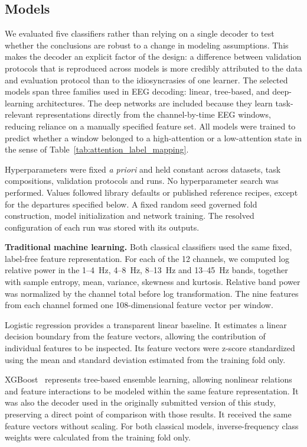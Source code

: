 \documentclass[10pt,letterpaper]{article}
\newcommand{\rev}[1]{#1}
\newcommand{\revs}[1]{#1}
\begin{document}
\subsection*{\revs{Models}}

\rev{We evaluated five classifiers rather than relying on a single decoder to
test whether the conclusions are robust to a change in modeling assumptions.
This makes the decoder an explicit factor of the design: a difference between
validation protocols that is reproduced across models is more credibly
attributed to the data and evaluation protocol than to the idiosyncrasies of
one learner. The selected models span three families used in EEG decoding:
linear, tree-based, and deep-learning architectures. The deep networks are
included because they learn task-relevant representations directly from the
channel-by-time EEG windows, reducing reliance on a manually specified feature
set. All models were trained to predict whether a window belonged to a
high-attention or a low-attention state in the sense of
Table~\ref{tab:attention_label_mapping}.}

\rev{Hyperparameters were fixed \textit{a priori} and held constant across
datasets, task compositions, validation protocols and runs. No hyperparameter
search was performed. Values followed library defaults or published reference
recipes, except for the departures specified below. A fixed random seed
governed fold construction, model initialization and network training. The
resolved configuration of each run was stored with its outputs.}

\textbf{Traditional machine learning.}
\rev{Both classical classifiers used the same fixed, label-free feature
representation. For each of the 12 channels, we computed log relative power in
the 1--4~Hz, 4--8~Hz, 8--13~Hz and 13--45~Hz bands, together with sample
entropy, mean, variance, skewness and kurtosis. Relative band power was
normalized by the channel total before log transformation. The nine features
from each channel formed one 108-dimensional feature vector per window.}

\rev{Logistic regression provides a transparent linear baseline. It estimates
a linear decision boundary from the feature vectors, allowing the contribution
of individual features to be inspected. Its feature vectors were z-score
standardized using the mean and standard deviation estimated from the training
fold only.}

\rev{XGBoost~\cite{chen2016xgboost} represents tree-based ensemble learning,
allowing nonlinear relations and feature interactions to be modeled within the
same feature representation. It was also the decoder used in the originally
submitted version of this study, preserving a direct point of comparison with
those results. It received the same feature vectors without scaling. For both
classical models, inverse-frequency class weights were calculated from the
training fold only.}
\end{document}
